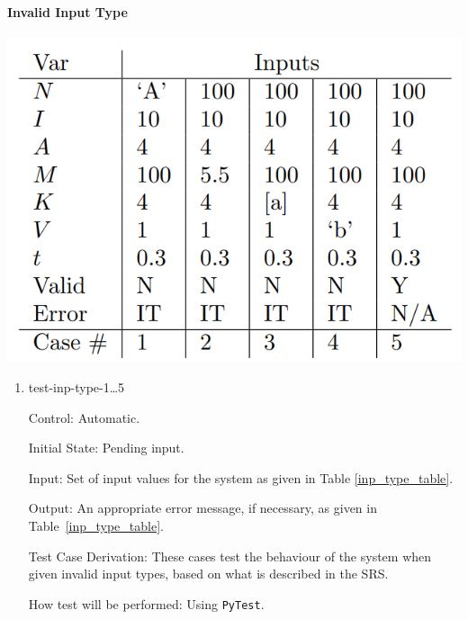 \documentclass[12pt, titlepage]{article}
\begin{document}
\newpage

\paragraph{Invalid Input Type}
\begin{center}
  \includegraphics[scale=0.5]{InvTypeTable.PNG} \\
  \label{inp_type_table}
\end{center}

\begin{enumerate}

  \item{test-inp-type-1\dots5\\}
  
  Control: Automatic.
            
  Initial State: Pending input.
            
  Input: Set of input values for the system as given in Table \ref{inp_type_table}.
            
  Output: An appropriate error message, if necessary, as given in Table~\ref{inp_type_table}.
  
  Test Case Derivation: These cases test the behaviour of the system when given invalid input types, based on what is described in the SRS.
            
  How test will be performed: Using \texttt{PyTest}. 
\end{enumerate}

\newpage
\end{document}
